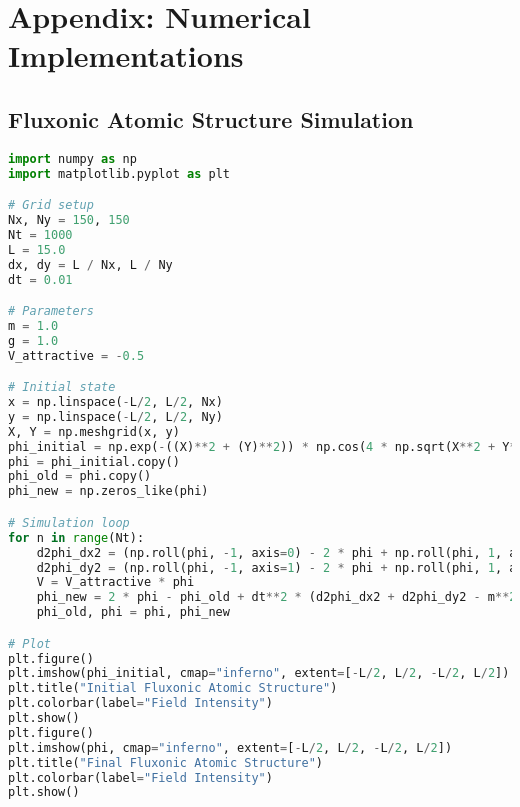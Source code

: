 \documentclass{article}
\begin{document}
\section{Appendix: Numerical Implementations}
\subsection{Fluxonic Atomic Structure Simulation}
\begin{lstlisting}[language=Python, caption=Fluxonic Atomic Structure Simulation, label=lst:atomic]
import numpy as np
import matplotlib.pyplot as plt

# Grid setup
Nx, Ny = 150, 150
Nt = 1000
L = 15.0
dx, dy = L / Nx, L / Ny
dt = 0.01

# Parameters
m = 1.0
g = 1.0
V_attractive = -0.5

# Initial state
x = np.linspace(-L/2, L/2, Nx)
y = np.linspace(-L/2, L/2, Ny)
X, Y = np.meshgrid(x, y)
phi_initial = np.exp(-((X)**2 + (Y)**2)) * np.cos(4 * np.sqrt(X**2 + Y**2))
phi = phi_initial.copy()
phi_old = phi.copy()
phi_new = np.zeros_like(phi)

# Simulation loop
for n in range(Nt):
    d2phi_dx2 = (np.roll(phi, -1, axis=0) - 2 * phi + np.roll(phi, 1, axis=0)) / dx**2
    d2phi_dy2 = (np.roll(phi, -1, axis=1) - 2 * phi + np.roll(phi, 1, axis=1)) / dy**2
    V = V_attractive * phi
    phi_new = 2 * phi - phi_old + dt**2 * (d2phi_dx2 + d2phi_dy2 - m**2 * phi - g * phi**3 + V)
    phi_old, phi = phi, phi_new

# Plot
plt.figure()
plt.imshow(phi_initial, cmap="inferno", extent=[-L/2, L/2, -L/2, L/2])
plt.title("Initial Fluxonic Atomic Structure")
plt.colorbar(label="Field Intensity")
plt.show()
plt.figure()
plt.imshow(phi, cmap="inferno", extent=[-L/2, L/2, -L/2, L/2])
plt.title("Final Fluxonic Atomic Structure")
plt.colorbar(label="Field Intensity")
plt.show()
\end{lstlisting}
\end{document}
